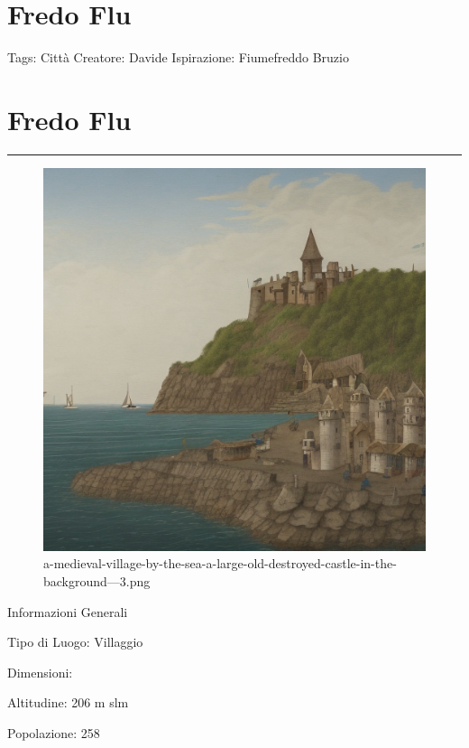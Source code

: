 \section{Fredo Flu}\label{fredo-flu}

Tags: Città Creatore: Davide Ispirazione: Fiumefreddo Bruzio

\section{Fredo Flu}\label{fredo-flu-1}

\begin{center}\rule{0.5\linewidth}{0.5pt}\end{center}

\begin{figure}
\centering
\includegraphics{a-medieval-village-by-the-sea-a-large-old-destroyed-castle-in-the-background---3.png}
\caption{a-medieval-village-by-the-sea-a-large-old-destroyed-castle-in-the-background---3.png}
\end{figure}

Informazioni Generali

Tipo di Luogo: Villaggio

Dimensioni:

Altitudine: 206 m slm

Popolazione: 258

